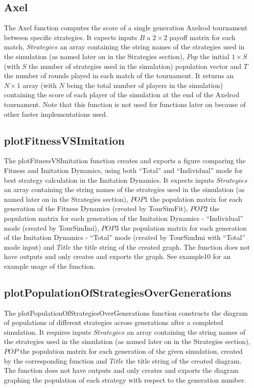 \subsection{Axel}
The Axel function computes the score of a single generation Axelrod tournament between specific strategies. It expects inputs $B$ a $2 \times 2$ payoff matrix for each match, $Strategies$ an array containing the string names of the strategies used in the simulation (as named later on in the Strategies section), $Pop$ the initial $1 \times S$ (with $S$ the number of strategies used in the simulation) population vector and $T$ the number of rounds played in each match of the tournament. It returns an $N \times 1$ array (with $N$ being the total number of players in the simulation) containing the score of each player of the simulation at the end of the Axelrod tournament. Note that this function is not used for functions later on because of other faster implementations used.

\subsection{plotFitnessVSImitation}
The plotFitnessVSImitation function creates and exports a figure comparing the Fitness and Imitation Dynamics, using both ``Total'' and ``Individual'' mode for best strategy calculation in the Imitation Dynamics. It expects inputs $Strategies$ an array containing the string names of the strategies used in the simulation (as named later on in the Strategies section), $POP1$ the population matrix for each generation of the Fitness Dynamics (created by TourSimFit), $POP2$ the population matrix for each generation of the Imitation Dynamics - ``Individual'' mode (created by TourSimImi), $POP3$ the population matrix for each generation of the Imitation Dynamics - ``Total'' mode (created by TourSimImi with ``Total'' mode input) and $Title$ the title string of the created graph. The function does not have outputs and only creates and exports the graph. See example10 for an example usage of the function.

\subsection{plotPopulationOfStrategiesOverGenerations}
The plotPopulationOfStrategiesOverGenerations function constructs the diagram of populations of different strategies across generations after a completed simulation. It requires inputs $Strategies$ an array containing the string names of the strategies used in the simulation (as named later on in the Strategies section), $POP$ the population matrix for each generation of the given simulation, created by the corresponding function and $Title$ the title string of the created diagram. The function does not have outputs and only creates and exports the diagram graphing the population of each strategy with respect to the generation number.

